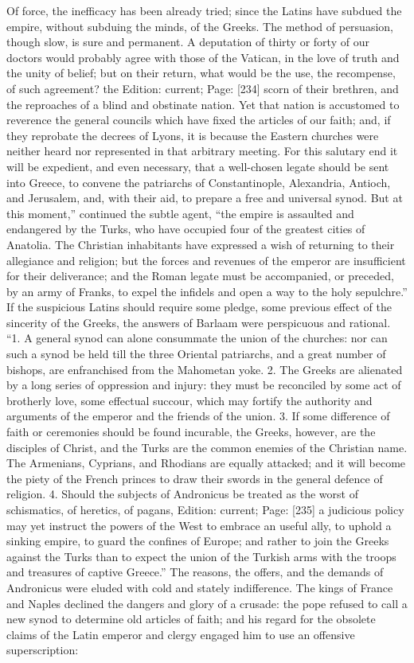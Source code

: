 Of force, the inefficacy has been already tried; since the Latins have subdued the empire, without subduing the minds, of the Greeks. The method of persuasion, though slow, is sure and permanent. A deputation of thirty or forty of our doctors would probably agree with those of the Vatican, in the love of truth and the unity of belief; but on their return, what would be the use, the recompense, of such agreement? the Edition: current; Page: [234] scorn of their brethren, and the reproaches of a blind and obstinate nation. Yet that nation is accustomed to reverence the general councils which have fixed the articles of our faith; and, if they reprobate the decrees of Lyons, it is because the Eastern churches were neither heard nor represented in that arbitrary meeting. For this salutary end it will be expedient, and even necessary, that a well-chosen legate should be sent into Greece, to convene the patriarchs of Constantinople, Alexandria, Antioch, and Jerusalem, and, with their aid, to prepare a free and universal synod. But at this moment,\texthebrew{}” continued the subtle agent, \texthebrew{“}the empire is assaulted and endangered by the Turks, who have occupied four of the greatest cities of Anatolia. The Christian inhabitants have expressed a wish of returning to their allegiance and religion; but the forces and revenues of the emperor are insufficient for their deliverance; and the Roman legate must be accompanied, or preceded, by an army of Franks, to expel the infidels and open a way to the holy sepulchre.\texthebrew{}” If the suspicious Latins should require some pledge, some previous effect of the sincerity of the Greeks, the answers of Barlaam were perspicuous and rational. \texthebrew{“}1. A general synod can alone consummate the union of the churches: nor can such a synod be held till the three Oriental patriarchs, and a great number of bishops, are enfranchised from the Mahometan yoke. 2. The Greeks are alienated by a long series of oppression and injury: they must be reconciled by some act of brotherly love, some effectual succour, which may fortify the authority and arguments of the emperor and the friends of the union. 3. If some difference of faith or ceremonies should be found incurable, the Greeks, however, are the disciples of Christ, and the Turks are the common enemies of the Christian name. The Armenians, Cyprians, and Rhodians are equally attacked; and it will become the piety of the French princes to draw their swords in the general defence of religion. 4. Should the subjects of Andronicus be treated as the worst of schismatics, of heretics, of pagans, Edition: current; Page: [235] a judicious policy may yet instruct the powers of the West to embrace an useful ally, to uphold a sinking empire, to guard the confines of Europe; and rather to join the Greeks against the Turks than to expect the union of the Turkish arms with the troops and treasures of captive Greece.\texthebrew{}” The reasons, the offers, and the demands of Andronicus were eluded with cold and stately indifference. The kings of France and Naples declined the dangers and glory of a crusade: the pope refused to call a new synod to determine old articles of faith; and his regard for the obsolete claims of the Latin emperor and clergy engaged him to use an offensive superscription: 